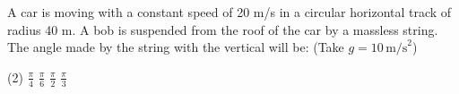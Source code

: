 \item A car is moving with a constant speed of 20 m/s in a circular horizontal track of radius 40 m. A bob is suspended from the roof of the car by a massless string. The angle made by the string with the vertical will be: (Take $ g = 10 \, \text{m/s}^2 $)
    \begin{tasks}(2)
        \task $ \frac{\pi}{4} $
        \task $ \frac{\pi}{6} $
        \task $ \frac{\pi}{2} $
        \task $ \frac{\pi}{3} $
    \end{tasks}